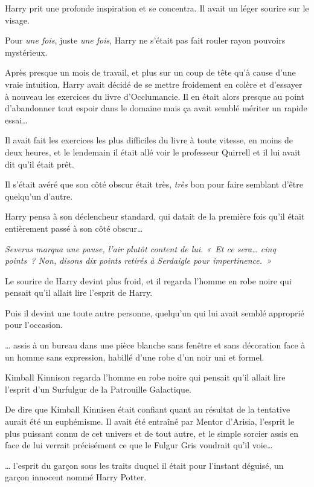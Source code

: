 Harry prit une profonde inspiration et se concentra. Il avait un léger sourire sur le visage.

Pour \emph{une fois}, juste \emph{une fois}, Harry ne s'était pas fait rouler rayon pouvoirs mystérieux.

Après presque un mois de travail, et plus sur un coup de tête qu'à cause d'une vraie intuition, Harry avait décidé de se mettre froidement en colère et d'essayer à nouveau les exercices du livre d'Occlumancie. Il en était alors presque au point d'abandonner tout espoir dans le domaine mais ça avait semblé mériter un rapide essai…

Il avait fait les exercices les plus difficiles du livre à toute vitesse, en moins de deux heures, et le lendemain il était allé voir le professeur Quirrell et il lui avait dit qu'il était prêt.

Il s'était avéré que son côté obscur était très, \emph{très} bon pour faire semblant d'être quelqu'un d'autre.

Harry pensa à son déclencheur standard, qui datait de la première fois qu'il était entièrement passé à son côté obscur…

\emph{Severus marqua une pause, l'air plutôt content de lui. «~Et ce sera… cinq points~? Non, disons dix points retirés à Serdaigle pour impertinence.~»}

Le sourire de Harry devint plus froid, et il regarda l'homme en robe noire qui pensait qu'il allait lire l'esprit de Harry.

Puis il devint une toute autre personne, quelqu'un qui lui avait semblé approprié pour l'occasion.

\later

… assis à un bureau dans une pièce blanche sans fenêtre et sans décoration face à un homme sans expression, habillé d’une robe d'un noir uni et formel.

Kimball Kinnison regarda l'homme en robe noire qui pensait qu'il allait lire l'esprit d'un Surfulgur de la Patrouille Galactique.

De dire que Kimball Kinnisen était confiant quant au résultat de la tentative aurait été un euphémisme. Il avait été entraîné par Mentor d'Arisia, l'esprit le plus puissant connu de cet univers et de tout autre, et le simple sorcier assis en face de lui verrait précisément ce que le Fulgur Gris voudrait qu'il voie…

… l'esprit du garçon sous les traits duquel il était pour l'instant déguisé, un garçon innocent nommé Harry Potter.

